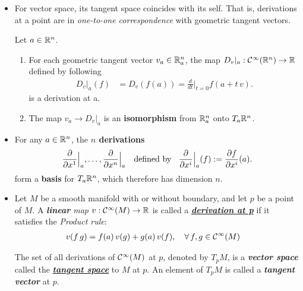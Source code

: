 \documentclass[11pt]{article}
\begin{document}
\begin{itemize}
\item \begin{remark}
For vector space, its tangent space coincides with its self. That is, derivations at a point are in \emph{one-to-one correspondence} with geometric tangent vectors.
\begin{proposition} \label{prop: iso_geo_tangent}
Let $a \in {\mathbb R}^n$.
\begin{enumerate}
\item For each geometric tangent vector $v_a \in {\mathbb R}_{a}^n$, the map $D_v|_a: {\mathcal C}^{\infty}({\mathbb R}^n) \rightarrow {\mathbb R}$ defined by following
\begin{align}
D_v|_a(f) &= D_{v}(f(a)) = \frac{d}{dt}\Big|_{t=0}f(a + t\,v). \label{eqn: directional_derivative}
\end{align}
 is a derivation at a.
\item The map $v_a \rightarrow D_v|_a$ is an \textbf{isomorphism} from ${\mathbb R}_{a}^n$ onto $T_{a}{\mathbb R}^n$.
\end{enumerate}
\end{proposition}
\end{remark}

\item \begin{corollary}\label{coro: basis_tangent_space}
For any $a \in {\mathbb R}^n$, the \textbf{$n$ derivations}
\begin{align}
\frac{\partial }{ \partial x^{1}}\Bigr|_{a}, \ldots, \frac{\partial }{ \partial x^{n}}\Bigr|_{a} \quad\text{defined by }\;\;\frac{\partial }{ \partial x^{i}}\Bigr|_{a}(f) := \frac{\partial f}{ \partial x^{i}}(a).
\end{align} form a \textbf{basis} for $T_{a}{\mathbb R}^n$, which therefore has dimension $n$.
\end{corollary}


\item 
\begin{definition}
Let $M$ be a smooth manifold with or without boundary, and let $p$ be a point of $M$. A \emph{\textbf{linear} map} $v: {\mathcal C}^{\infty}(M) \rightarrow {\mathbb R}$ is called a \underline{\textbf{\emph{derivation at p}}} if it satisfies the \emph{Product rule}:
\begin{align}
v(f\,g) &= f(a)\,v(g) + g(a)\,v(f), \quad \forall\,f,g \in {\mathcal C}^{\infty}(M)  \label{eqn: derivation_def_man}
\end{align}

The set of all derivations of ${\mathcal C}^{\infty}(M)$ at $p$, denoted by $T_{p}M$, is a \emph{\textbf{vector space}} called the \underline{\emph{\textbf{tangent space}}} to $M$ at $p$. An element of $T_{p}M$ is called a \emph{\textbf{tangent vector}} at $p$.
\end{definition}



\end{itemize}
\end{document}
